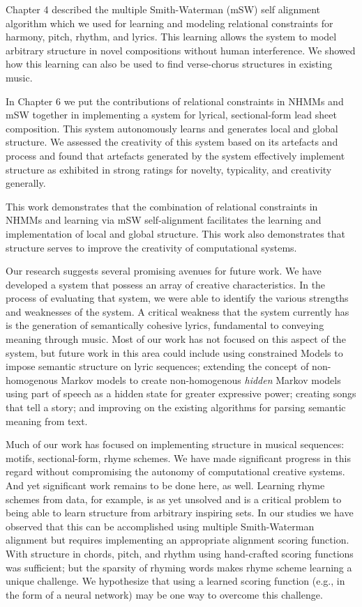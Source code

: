 \documentclass[phd,electronic,oneside,twosidetoc,letterpaper,chaptercenter,parttop,lof,lot]{byumsphd}
\begin{document}
Chapter 4 described the multiple Smith-Waterman (mSW) self alignment algorithm which we used for learning and modeling relational constraints for harmony, pitch, rhythm, and lyrics. This learning allows the system to model arbitrary structure in novel compositions without human interference. We showed how this learning can also be used to find verse-chorus structures in existing music.

In Chapter 6 we put the contributions of relational constraints in NHMMs and mSW together in implementing a system for lyrical, sectional-form lead sheet composition. This system autonomously learns and generates local and global structure. We assessed the creativity of this system based on its artefacts and process and found that artefacts generated by the system effectively implement structure as exhibited in strong ratings for novelty, typicality, and creativity generally.

This work demonstrates that the combination of relational constraints in NHMMs and learning via mSW self-alignment facilitates the learning and implementation of local and global structure. This work also demonstrates that structure serves to improve the creativity of computational systems.

Our research suggests several promising avenues for future work. We have developed a system that possess an array of creative characteristics. In the process of evaluating that system, we were able to identify the various strengths and weaknesses of the system. A critical weakness that the system currently has is the generation of semantically cohesive lyrics, fundamental to conveying meaning through music. Most of our work has not focused on this aspect of the system, but future work in this area could include using constrained Models to impose semantic structure on lyric sequences; extending the concept of non-homogenous Markov models to create non-homogenous \emph{hidden} Markov models using part of speech as a hidden state for greater expressive power; creating songs that tell a story; and improving on the existing algorithms for parsing semantic meaning from text.

Much of our work has focused on implementing structure in musical sequences: motifs, sectional-form, rhyme schemes. We have made significant progress in this regard without compromising the autonomy of computational creative systems. And yet significant work remains to be done here, as well. Learning rhyme schemes from data, for example, is as yet unsolved and is a critical problem to being able to learn structure from arbitrary inspiring sets. In our studies we have observed that this can be accomplished using multiple Smith-Waterman alignment but requires implementing an appropriate alignment scoring function. With structure in chords, pitch, and rhythm using hand-crafted scoring functions was sufficient; but the sparsity of rhyming words makes rhyme scheme learning a unique challenge. We hypothesize that using a learned scoring function (e.g., in the form of a neural network) may be one way to overcome this challenge. 
\end{document}
